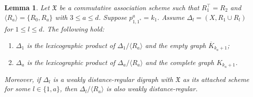 \documentclass[12pt,a4paper]{amsart}
\newtheorem{lemma}[thm]{Lemma}
\theoremstyle{definition}
\begin{document}
\begin{lemma} \label{lem}
Let $\mathfrak{X}$ be a commutative association scheme such that $R_1^{\top}=R_2$ and $\langle R_a\rangle=\{R_0,R_a\}$ with $3\leq a\leq d$. Suppose $p_{1,1^{*}}^{a}=k_1$. Assume $\Delta_l=(X,R_1\cup R_l)$ for $1\leq l\leq d$. The following hold:
\begin{enumerate}
\item\label{lem-1} $\Delta_1$ is the lexicographic product of $\Delta_1/\langle R_a\rangle$ and the empty graph $\overline{K}_{k_a+1}$;
		
\item\label{lem-2} $\Delta_a$ is the lexicographic product of $\Delta_a/\langle R_a\rangle$ and the complete graph $K_{k_a+1}$.
\end{enumerate}
Moreover, if $\Delta_l$ is a weakly distance-regular digraph with $\mathfrak{X}$ as its attached scheme for some $l\in\{1,a\}$, then $\Delta_l/\langle R_a\rangle$ is also weakly distance-regular.
\end{lemma}
\end{document}
